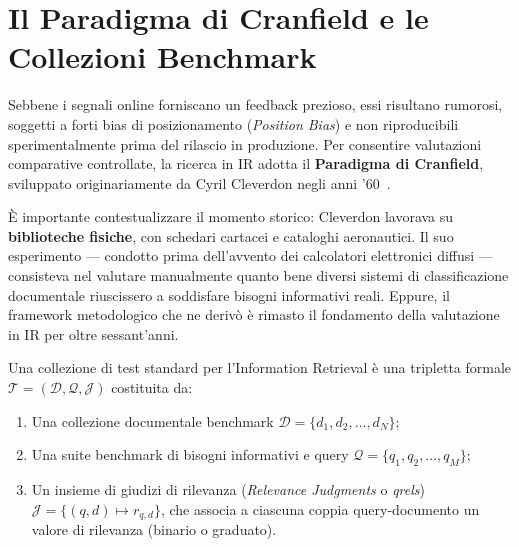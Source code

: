 \FloatBarrier
\section{Il Paradigma di Cranfield e le Collezioni Benchmark}

Sebbene i segnali online forniscano un feedback prezioso, essi risultano rumorosi, soggetti a forti bias di posizionamento (\textit{Position Bias}) e non riproducibili sperimentalmente prima del rilascio in produzione.
Per consentire valutazioni comparative controllate, la ricerca in IR adotta il \textbf{Paradigma di Cranfield}, sviluppato originariamente da Cyril Cleverdon negli anni '60~\cite{cleverdon1967}.

È importante contestualizzare il momento storico: Cleverdon lavorava su \textbf{biblioteche fisiche}, con schedari cartacei e cataloghi aeronautici. Il suo esperimento — condotto prima dell'avvento dei calcolatori elettronici diffusi — consisteva nel valutare manualmente quanto bene diversi sistemi di classificazione documentale riuscissero a soddisfare bisogni informativi reali. Eppure, il framework metodologico che ne derivò è rimasto il fondamento della valutazione in IR per oltre sessant'anni.

\begin{definition}
Una collezione di test standard per l'Information Retrieval è una tripletta formale $\mathcal{T} = (\mathcal{D}, \mathcal{Q}, \mathcal{J})$ costituita da:
\begin{enumerate}
    \item Una collezione documentale benchmark $\mathcal{D} = \{d_1, d_2, \dots, d_N\}$;
    \item Una suite benchmark di bisogni informativi e query $\mathcal{Q} = \{q_1, q_2, \dots, q_M\}$;
    \item Un insieme di giudizi di rilevanza (\textit{Relevance Judgments} o \textit{qrels}) $\mathcal{J} = \{ (q, d) \mapsto r_{q, d} \}$, che associa a ciascuna coppia query-documento un valore di rilevanza (binario o graduato).
\end{enumerate}
\end{definition}

